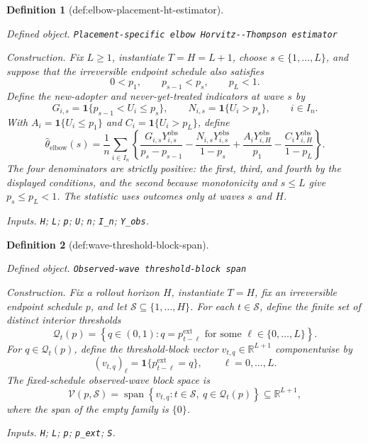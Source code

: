 \documentclass{article}
\newtheorem{definition}{Definition}
\begin{document}
\begin{definition}[def:elbow-placement-ht-estimator]\label{def:elbow-placement-ht-estimator}
\par\smallskip\noindent\emph{Defined object.} \texttt{Placement-\allowbreak{}specific elbow Horvitz-\allowbreak{}-\allowbreak{}Thompson estimator}
\par\smallskip\noindent\emph{Construction.} Fix \(L\geq1\), instantiate \(T=H=L+1\), choose \(s\in\{1,\ldots,L\}\), and suppose that the irreversible endpoint schedule also satisfies
\[
 0<p_1,\qquad p_{s-1}<p_s,\qquad p_L<1.
\]
Define the new-adopter and never-yet-treated indicators at wave \(s\) by
\[
 G_{i,s}=\mathbf 1\{p_{s-1}<U_i\leq p_s\},
 \qquad
 N_{i,s}=\mathbf 1\{U_i>p_s\},
 \qquad i\in I_n.
\]
With \(A_i=\mathbf 1\{U_i\leq p_1\}\) and \(C_i=\mathbf 1\{U_i>p_L\}\), define
\[
 \widehat\theta_{\mathrm{elbow}}(s)
 =\frac1n\sum_{i\in I_n}
 \left\{
 \frac{G_{i,s}Y^{\mathrm{obs}}_{i,s}}{p_s-p_{s-1}}
 -\frac{N_{i,s}Y^{\mathrm{obs}}_{i,s}}{1-p_s}
 +\frac{A_iY^{\mathrm{obs}}_{i,H}}{p_1}
 -\frac{C_iY^{\mathrm{obs}}_{i,H}}{1-p_L}
 \right\}.
\]
The four denominators are strictly positive: the first, third, and fourth by the displayed conditions, and the second because monotonicity and \(s\leq L\) give \(p_s\leq p_L<1\).  The statistic uses outcomes only at waves \(s\) and \(H\).
\par\smallskip\noindent\emph{Inputs.} \texttt{H}; \texttt{L}; \texttt{p}; \texttt{U}; \texttt{n}; \texttt{I\_\allowbreak{}n}; \texttt{Y\_\allowbreak{}obs}.
\end{definition}

\begin{definition}[def:wave-threshold-block-span]\label{def:wave-threshold-block-span}
\par\smallskip\noindent\emph{Defined object.} \texttt{Observed-\allowbreak{}wave threshold-\allowbreak{}block span}
\par\smallskip\noindent\emph{Construction.} Fix a rollout horizon \(H\), instantiate \(T=H\), fix an irreversible endpoint schedule \(p\), and let \(\mathcal S\subseteq\{1,\ldots,H\}\).  For each \(t\in\mathcal S\), define the finite set of distinct interior thresholds
\[
 \mathcal Q_t(p)
 =\left\{q\in(0,1):q=p^{\mathrm{ext}}_{t-\ell}
       \text{ for some }\ell\in\{0,\ldots,L\}\right\}.
\]
For \(q\in\mathcal Q_t(p)\), define the threshold-block vector \(v_{t,q}\in\mathbb R^{L+1}\) componentwise by
\[
 (v_{t,q})_\ell
 =\mathbf 1\{p^{\mathrm{ext}}_{t-\ell}=q\},
 \qquad \ell=0,\ldots,L.
\]
The fixed-schedule observed-wave block space is
\[
 \mathcal V(p,\mathcal S)
 =\operatorname{span}\left\{v_{t,q}:
       t\in\mathcal S,\ q\in\mathcal Q_t(p)\right\}
 \subseteq\mathbb R^{L+1},
\]
where the span of the empty family is \(\{0\}\).
\par\smallskip\noindent\emph{Inputs.} \texttt{H}; \texttt{L}; \texttt{p}; \texttt{p\_\allowbreak{}ext}; \texttt{S}.
\end{definition}
\end{document}
